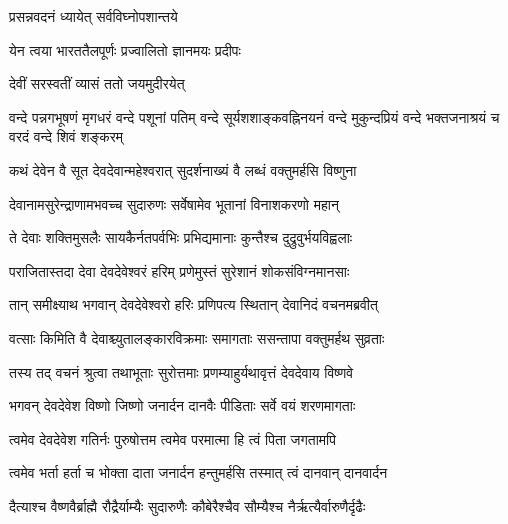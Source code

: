 \label{sec:start_ShivaSahasranamaStotram-VishnuKrtam}

{प्रसन्नवदनं ध्यायेत् सर्वविघ्नोपशान्तये}

{येन त्वया भारततैलपूर्णः प्रज्वालितो ज्ञानमयः प्रदीपः}%


{देवीं सरस्वतीं व्यासं ततो जयमुदीरयेत्}


{वन्दे पन्नगभूषणं मृगधरं वन्दे पशूनां पतिम्}
{वन्दे सूर्यशशाङ्कवह्निनयनं वन्दे मुकुन्दप्रियं}
{वन्दे भक्तजनाश्रयं च वरदं वन्दे शिवं शङ्करम्}



\twolineshloka
{कथं देवेन वै सूत देवदेवान्महेश्वरात्}
{सुदर्शनाख्यं वै लब्धं वक्तुमर्हसि विष्णुना} %


\twolineshloka
{देवानामसुरेन्द्राणामभवच्च सुदारुणः}
{सर्वेषामेव भूतानां विनाशकरणो महान्} %

\twolineshloka
{ते देवाः शक्तिमुसलैः सायकैर्नतपर्वभिः}
{प्रभिद्यमानाः कुन्तैश्च दुद्रुवुर्भयविह्वलाः} %

\twolineshloka
{पराजितास्तदा देवा देवदेवेश्वरं हरिम्}
{प्रणेमुस्तं सुरेशानं शोकसंविग्नमानसाः} %

\twolineshloka
{तान् समीक्ष्याथ भगवान् देवदेवेश्वरो हरिः}
{प्रणिपत्य स्थितान् देवानिदं वचनमब्रवीत्} %

\twolineshloka
{वत्साः किमिति वै देवाश्च्युतालङ्कारविक्रमाः}
{समागताः ससन्तापा वक्तुमर्हथ सुव्रताः} %

\twolineshloka
{तस्य तद् वचनं श्रुत्वा तथाभूताः सुरोत्तमाः}
{प्रणम्याहुर्यथावृत्तं देवदेवाय विष्णवे} %

\twolineshloka
{भगवन् देवदेवेश विष्णो जिष्णो जनार्दन}
{दानवैः पीडिताः सर्वे वयं शरणमागताः} %

\twolineshloka
{त्वमेव देवदेवेश गतिर्नः पुरुषोत्तम}
{त्वमेव परमात्मा हि त्वं पिता जगतामपि} %

\twolineshloka
{त्वमेव भर्ता हर्ता च भोक्ता दाता जनार्दन}
{हन्तुमर्हसि तस्मात् त्वं दानवान् दानवार्दन} %

\twolineshloka
{दैत्याश्च वैष्णवैर्ब्राह्मै रौद्रैर्याम्यैः सुदारुणैः}
{कौबेरैश्चैव सौम्यैश्च नैर्ऋत्यैर्वारुणैर्दृढैः} %

